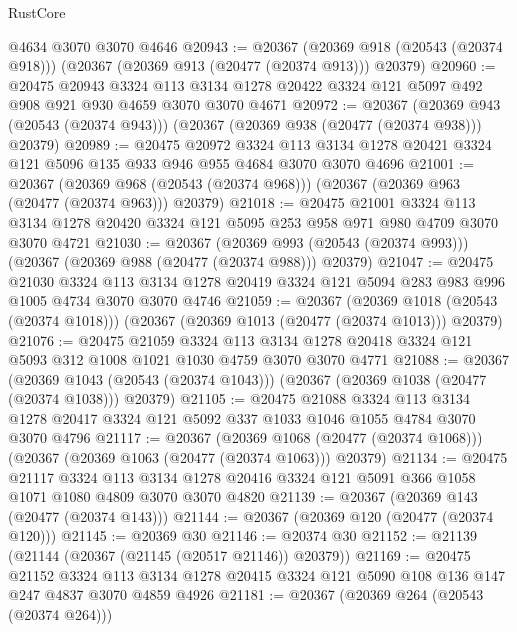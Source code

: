 \begin{lexlean}{RustCore}
\begin{coremodule}
    @4634
    @3070
    @3070
    @4646
@20943 := @20367
    (@20369 @918 (@20543 (@20374 @918)))
    (@20367 (@20369 @913 (@20477 (@20374 @913))) @20379)
@20960 := @20475
    @20943
    @3324
    @113
    @3134
    @1278
    @20422
    @3324
    @121
    @5097
    @492
    @908
    @921
    @930
    @4659
    @3070
    @3070
    @4671
@20972 := @20367
    (@20369 @943 (@20543 (@20374 @943)))
    (@20367 (@20369 @938 (@20477 (@20374 @938))) @20379)
@20989 := @20475
    @20972
    @3324
    @113
    @3134
    @1278
    @20421
    @3324
    @121
    @5096
    @135
    @933
    @946
    @955
    @4684
    @3070
    @3070
    @4696
@21001 := @20367
    (@20369 @968 (@20543 (@20374 @968)))
    (@20367 (@20369 @963 (@20477 (@20374 @963))) @20379)
@21018 := @20475
    @21001
    @3324
    @113
    @3134
    @1278
    @20420
    @3324
    @121
    @5095
    @253
    @958
    @971
    @980
    @4709
    @3070
    @3070
    @4721
@21030 := @20367
    (@20369 @993 (@20543 (@20374 @993)))
    (@20367 (@20369 @988 (@20477 (@20374 @988))) @20379)
@21047 := @20475
    @21030
    @3324
    @113
    @3134
    @1278
    @20419
    @3324
    @121
    @5094
    @283
    @983
    @996
    @1005
    @4734
    @3070
    @3070
    @4746
@21059 := @20367
    (@20369 @1018 (@20543 (@20374 @1018)))
    (@20367 (@20369 @1013 (@20477 (@20374 @1013))) @20379)
@21076 := @20475
    @21059
    @3324
    @113
    @3134
    @1278
    @20418
    @3324
    @121
    @5093
    @312
    @1008
    @1021
    @1030
    @4759
    @3070
    @3070
    @4771
@21088 := @20367
    (@20369 @1043 (@20543 (@20374 @1043)))
    (@20367 (@20369 @1038 (@20477 (@20374 @1038))) @20379)
@21105 := @20475
    @21088
    @3324
    @113
    @3134
    @1278
    @20417
    @3324
    @121
    @5092
    @337
    @1033
    @1046
    @1055
    @4784
    @3070
    @3070
    @4796
@21117 := @20367
    (@20369 @1068 (@20477 (@20374 @1068)))
    (@20367 (@20369 @1063 (@20477 (@20374 @1063))) @20379)
@21134 := @20475
    @21117
    @3324
    @113
    @3134
    @1278
    @20416
    @3324
    @121
    @5091
    @366
    @1058
    @1071
    @1080
    @4809
    @3070
    @3070
    @4820
@21139 := @20367 (@20369 @143 (@20477 (@20374 @143)))
@21144 := @20367 (@20369 @120 (@20477 (@20374 @120)))
@21145 := @20369 @30
@21146 := @20374 @30
@21152 := @21139 (@21144 (@20367 (@21145 (@20517 @21146)) @20379))
@21169 := @20475
    @21152
    @3324
    @113
    @3134
    @1278
    @20415
    @3324
    @121
    @5090
    @108
    @136
    @147
    @247
    @4837
    @3070
    @4859
    @4926
@21181 := @20367
    (@20369 @264 (@20543 (@20374 @264)))

\end{coremodule}
\end{lexlean}
